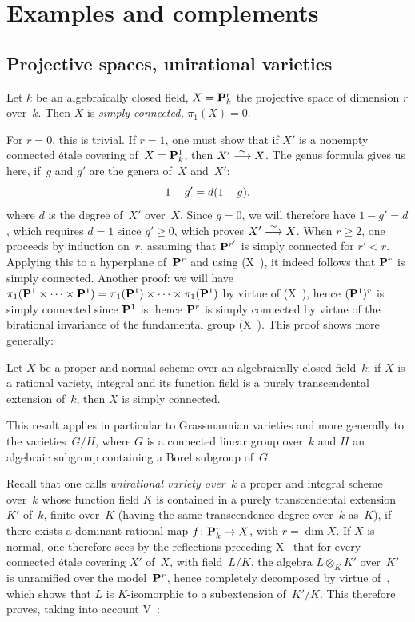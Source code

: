 \chapter{Examples and complements}
\label{XI}

\section{Projective spaces, unirational varieties}
\label{XI.1}

\begin{proposition}
\label{XI.1.1}
Let $k$ be an algebraically closed field, $X=\mathbf{P}_k^r$ the projective
space of dimension $r$ over~$k$. Then $X$ is \emph{simply
connected,} \ie $\pi_1(X)=0$.
\end{proposition}

For $r=0$, this is trivial. If $r=1$, one must show that if $X'$ is
a nonempty connected \'etale covering of~$X=\mathbf{P}_k^1$, then
$X'\overset{\sim}{\longrightarrow} X$. The genus formula gives us here, if~$g$ and $g'$ are
the genera of~$X$ and~$X'$:
$$
1-g' = d(1-g),
$$
where $d$ is the degree of~$X'$ over~$X$. Since $g=0$, we will therefore have
$1-g'=d$, which requires $d=1$ since $g'\ge 0$, which proves
$X'\overset{\sim}{\longrightarrow} X$. When $r\ge 2$, one proceeds by induction
on~$r$, assuming that $\mathbf{P}^{r'}$ is simply connected for
$r'<r$. Applying this to a hyperplane of~$\mathbf{P}^r$ and using
(X~), it indeed follows that $\mathbf{P}^r$ is simply
connected. Another proof: we will have
$\pi_1(\mathbf{P}^1\times\cdots\times \mathbf{P}^1) = \pi_1(\mathbf{P}^1)\times\cdots
\times \pi_1(\mathbf{P}^1)$ by virtue of (X~), hence $(\mathbf{P}^1)^r$
is simply connected since $\mathbf{P}^1$ is, hence $\mathbf{P}^r$ is
simply connected by virtue of the birational invariance of the fundamental
group (X~). This proof shows more
generally:

\begin{corollary}
\label{XI.1.2}
Let $X$ be a proper and normal scheme over an
algebraically closed field~$k$; if $X$ is a rational
variety, \ie integral and its function field is a purely
transcendental extension of~$k$, then $X$ is simply connected.
\end{corollary}

This result applies in particular to Grassmannian
varieties and more
generally to the varieties~$G/H$, where $G$ is a connected linear
group over~$k$ and $H$ an algebraic subgroup containing a Borel
subgroup of~$G$.

Recall that one calls \emph{unirational variety over~$k$}
a proper and integral scheme over~$k$ whose function
field $K$ is contained in a purely transcendental extension~$K'$
of~$k$, finite over~$K$ (\ie having the same transcendence degree
over~$k$ as~$K$), \ie if there exists a dominant rational
map $f\colon\PP_k^r\to X$, with $r=\dim X$. If $X$ is normal,
one therefore sees by the reflections preceding X~
that for every connected \'etale covering $X'$ of~$X$, with
field~$L/K$, the algebra $L\otimes_K K'$ over~$K'$ is
unramified over the model~$\mathbf{P}^r$, hence completely
decomposed by virtue of~, which shows that $L$ is
$K$-isomorphic to a subextension of~$K'/K$. This therefore proves,
taking into account V~:

